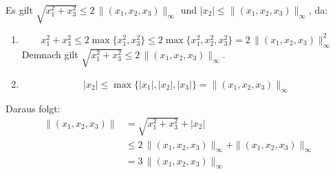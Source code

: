 \documentclass[a4paper,12pt]{article}
\begin{document}
\begin{enumerate}[label=\alph*)]
\begin{enumerate}[label=(\roman*)]
        Es gilt $\sqrt{x_1^2 + x_3^2} \leq 2\,\|(x_1, x_2, x_3)\|_\infty$
        und $|x_2| \leq \|(x_1, x_2, x_3)\|_\infty$, da:

        \begin{enumerate}[label=\arabic*.]
            \item
            \[
                x_1^2 + x_3^2 \leq 2\max\{x_1^2, x_3^2\}
                \leq 2\max\{x_1^2, x_2^2, x_3^2\}
                = 2\,\|(x_1, x_2, x_3)\|_\infty^2
            \]
            Demnach gilt $\sqrt{x_1^2 + x_3^2} \leq 2\,\|(x_1, x_2, x_3)\|_\infty$.

            \item
            \[
                |x_2| \leq \max\{|x_1|, |x_2|, |x_3|\} = \|(x_1, x_2, x_3)\|_\infty
            \]
        \end{enumerate}

        Daraus folgt:
        \begin{align*}
            \|(x_1, x_2, x_3)\| &= \sqrt{x_1^2 + x_3^2} + |x_2| \\
                                 &\leq 2\,\|(x_1, x_2, x_3)\|_\infty
                                       + \|(x_1, x_2, x_3)\|_\infty \\
                                 &= 3\,\|(x_1, x_2, x_3)\|_\infty
        \end{align*}

    \end{enumerate}

\end{enumerate}
\end{document}
